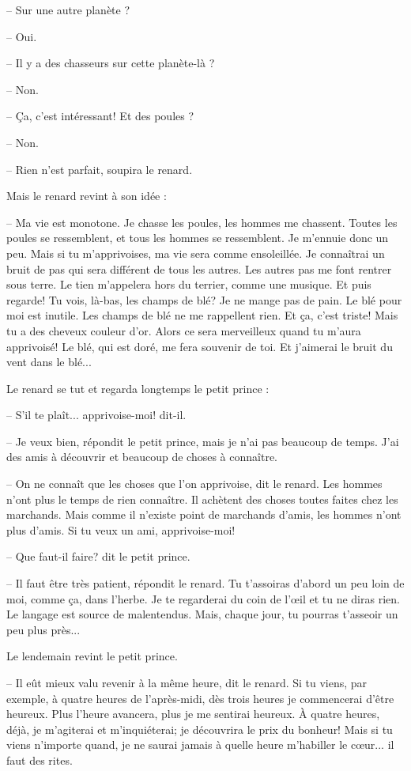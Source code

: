 \documentclass[a4paper]{report}
\begin{document}
-- Sur une autre planète ?

-- Oui.

-- Il y a des chasseurs sur cette planète-là ?

-- Non.

-- Ça, c'est intéressant! Et des poules ?

-- Non.

-- Rien n'est parfait, soupira le renard.

Mais le renard revint à son idée :

-- Ma vie est monotone. Je chasse les poules, les hommes me chassent. Toutes les poules se ressemblent, et tous les hommes se ressemblent. Je m'ennuie donc un peu. Mais si tu m'apprivoises, ma vie sera comme ensoleillée. Je connaîtrai un bruit de pas qui sera différent de tous les autres. Les autres pas me font rentrer sous terre. Le tien m'appelera hors du terrier, comme une musique. Et puis regarde! Tu vois, là-bas, les champs de blé? Je ne mange pas de pain. Le blé pour moi est inutile. Les champs de blé ne me rappellent rien. Et ça, c'est triste! Mais tu a des cheveux couleur d'or. Alors ce sera merveilleux quand tu m'aura apprivoisé! Le blé, qui est doré, me fera souvenir de toi. Et j'aimerai le bruit du vent dans le blé...

Le renard se tut et regarda longtemps le petit prince :

-- S'il te plaît... apprivoise-moi! dit-il.

-- Je veux bien, répondit le petit prince, mais je n'ai pas beaucoup de temps. J'ai des amis à découvrir et beaucoup de choses à connaître.

-- On ne connaît que les choses que l'on apprivoise, dit le renard. Les hommes n'ont plus le temps de rien connaître. Il achètent des choses toutes faites chez les marchands. Mais comme il n'existe point de marchands d'amis, les hommes n'ont plus d'amis. Si tu veux un ami, apprivoise-moi!

-- Que faut-il faire? dit le petit prince.

-- Il faut être très patient, répondit le renard. Tu t'assoiras d'abord un peu loin de moi, comme ça, dans l'herbe. Je te regarderai du coin de l'œil et tu ne diras rien. Le langage est source de malentendus. Mais, chaque jour, tu pourras t'asseoir un peu plus près...

Le lendemain revint le petit prince.

-- Il eût mieux valu revenir à la même heure, dit le renard. Si tu viens, par exemple, à quatre heures de l'après-midi, dès trois heures je commencerai d'être heureux. Plus l'heure avancera, plus je me sentirai heureux. À quatre heures, déjà, je m'agiterai et m'inquiéterai; je découvrira le prix du bonheur! Mais si tu viens n'importe quand, je ne saurai jamais à quelle heure m'habiller le cœur... il faut des rites.
\end{document}
